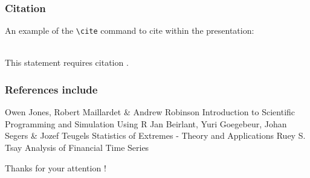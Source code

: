 \documentclass{beamer}
\begin{document}
\begin{frame}[fragile] %
\frametitle{Citation}
An example of the \verb|\cite| command to cite within the presentation:\\~

This statement requires citation \cite{p1}.
\end{frame}


\begin{frame}
\frametitle{References include}
\footnotesize{
\begin{thebibliography}{99} %
 Owen Jones, Robert Maillardet \& Andrew Robinson
\newblock Introduction to Scientific Programming and Simulation Using R
 Jan Beirlant, Yuri Goegebeur, Johan Segers \& Jozef Teugels
\newblock Statistics of Extremes - Theory and Applications
 Ruey S. Tsay 
\newblock Analysis of Financial Time Series
\end{thebibliography}
}
\end{frame}


\begin{frame}
\Huge{\centerline{Thanks for your attention ! }}
\end{frame}

\end{document}
